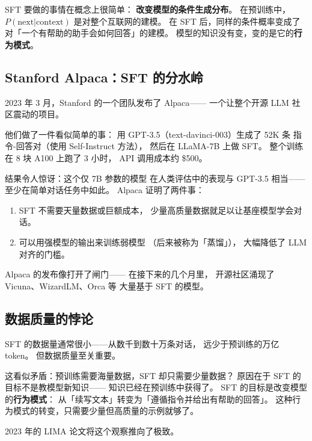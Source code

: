 SFT 要做的事情在概念上很简单：
\textbf{改变模型的条件生成分布}。
在预训练中，$P(\text{next} | \text{context})$ 是对整个互联网的建模。
在 SFT 后，同样的条件概率变成了
对「一个有帮助的助手会如何回答」的建模。
模型的知识没有变，变的是它的\textbf{行为模式}。

\subsection{Stanford Alpaca：SFT 的分水岭}

2023 年 3 月，Stanford 的一个团队发布了 Alpaca——
一个让整个开源 LLM 社区震动的项目。


他们做了一件看似简单的事：
用 GPT-3.5（text-davinci-003）生成了 52K 条
指令-回答对（使用 Self-Instruct 方法），
然后在 LLaMA-7B 上做 SFT。
整个训练在 8 块 A100 上跑了 3 小时，
API 调用成本约 \$500。

结果令人惊讶：这个仅 7B 参数的模型
在人类评估中的表现与 GPT-3.5 相当——
至少在简单对话任务中如此。
Alpaca 证明了两件事：
\begin{enumerate}[noitemsep]
  \item SFT 不需要天量数据或巨额成本，
        少量高质量数据就足以让基座模型学会对话。
  \item 可以用强模型的输出来训练弱模型
       （后来被称为「蒸馏」），
        大幅降低了 LLM 对齐的门槛。
\end{enumerate}

Alpaca 的发布像打开了闸门——
在接下来的几个月里，
开源社区涌现了 Vicuna、WizardLM、Orca 等
大量基于 SFT 的模型。

\subsection{数据质量的悖论}

SFT 的数据量通常很小——从数千到数十万条对话，
远少于预训练的万亿 token。
但数据质量至关重要。

这看似矛盾：预训练需要海量数据，SFT 却只需要少量数据？
原因在于 SFT 的目标不是教模型新知识——
知识已经在预训练中获得了。
SFT 的目标是改变模型的\textbf{行为模式}：
从「续写文本」转变为「遵循指令并给出有帮助的回答」。
这种行为模式的转变，只需要少量但高质量的示例就够了。

2023 年的 LIMA 论文将这个观察推向了极致。


